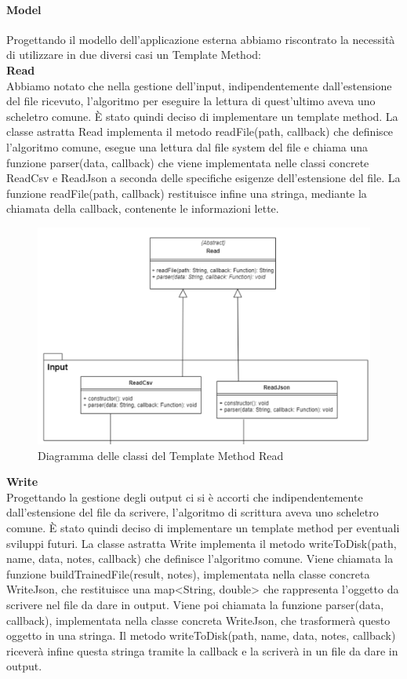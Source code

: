 			\paragraph{Model}
			Progettando il modello dell'applicazione esterna abbiamo riscontrato la necessità di utilizzare in due diversi casi un Template Method: \\
			\textbf{Read} \mbox{} \\ 
			Abbiamo notato che nella gestione dell'input, indipendentemente dall'estensione del file ricevuto, l'algoritmo per eseguire la lettura di quest'ultimo aveva uno scheletro comune. È stato quindi deciso di implementare un template method. La classe astratta Read implementa il metodo readFile(path, callback) che definisce l'algoritmo comune, esegue una lettura dal file system del file e chiama una funzione parser(data, callback) che viene implementata nelle classi concrete ReadCsv e ReadJson a seconda delle specifiche esigenze dell'estensione del file. La funzione readFile(path, callback) restituisce infine una stringa, mediante la chiamata della callback, contenente le informazioni lette. 
			\mbox{}
			\begin{figure} [H]
				\includegraphics[width=\linewidth]{./img/Diagrammi/Read.png}
				\caption{Diagramma delle classi del Template Method Read}
			\end{figure}
			\textbf{Write} \mbox{} \\ 
			Progettando la gestione degli output ci si è accorti che indipendentemente dall'estensione del file da scrivere, l'algoritmo di scrittura aveva uno scheletro comune. È stato quindi deciso di implementare un template method per eventuali sviluppi futuri. La classe astratta Write implementa il metodo writeToDisk(path, name, data, notes, callback) che definisce l'algoritmo comune. Viene chiamata la funzione buildTrainedFile(result, notes), implementata nella classe concreta WriteJson, che restituisce una map<String, double> che rappresenta l'oggetto da scrivere nel file da dare in output. Viene poi chiamata la funzione parser(data, callback), implementata nella classe concreta WriteJson, che trasformerà questo oggetto in una stringa. Il metodo writeToDisk(path, name, data, notes, callback) riceverà infine questa stringa tramite la callback e la scriverà in un file da dare in output.
